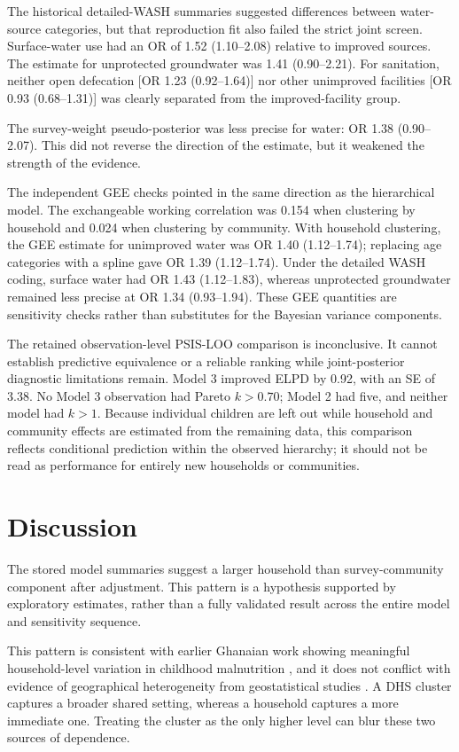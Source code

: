 \documentclass[11pt]{article}
\begin{document}
The historical detailed-WASH summaries suggested differences between water-source categories, but that reproduction fit also failed the strict joint screen. Surface-water use had an OR of 1.52 (1.10--2.08) relative to improved sources. The estimate for unprotected groundwater was 1.41 (0.90--2.21). For sanitation, neither open defecation [OR 1.23 (0.92--1.64)] nor other unimproved facilities [OR 0.93 (0.68--1.31)] was clearly separated from the improved-facility group.

The survey-weight pseudo-posterior was less precise for water: OR 1.38 (0.90--2.07). This did not reverse the direction of the estimate, but it weakened the strength of the evidence.

The independent GEE checks pointed in the same direction as the hierarchical model. The exchangeable working correlation was 0.154 when clustering by household and 0.024 when clustering by community. With household clustering, the GEE estimate for unimproved water was OR 1.40 (1.12--1.74); replacing age categories with a spline gave OR 1.39 (1.12--1.74). Under the detailed WASH coding, surface water had OR 1.43 (1.12--1.83), whereas unprotected groundwater remained less precise at OR 1.34 (0.93--1.94). These GEE quantities are sensitivity checks rather than substitutes for the Bayesian variance components.

The retained observation-level PSIS-LOO comparison is inconclusive. It cannot establish predictive equivalence or a reliable ranking while joint-posterior diagnostic limitations remain. Model 3 improved ELPD by 0.92, with an SE of 3.38. No Model 3 observation had Pareto $k>0.70$; Model 2 had five, and neither model had $k>1$. Because individual children are left out while household and community effects are estimated from the remaining data, this comparison reflects conditional prediction within the observed hierarchy; it should not be read as performance for entirely new households or communities.

\section{Discussion}

The stored model summaries suggest a larger household than survey-community component after adjustment. This pattern is a hypothesis supported by exploratory estimates, rather than a fully validated result across the entire model and sensitivity sequence.

This pattern is consistent with earlier Ghanaian work showing meaningful household-level variation in childhood malnutrition \citep{AhetoEtAl2015}, and it does not conflict with evidence of geographical heterogeneity from geostatistical studies \citep{AhetoDagne2021,AmoakoJohnson2022}. A DHS cluster captures a broader shared setting, whereas a household captures a more immediate one. Treating the cluster as the only higher level can blur these two sources of dependence.
\end{document}
